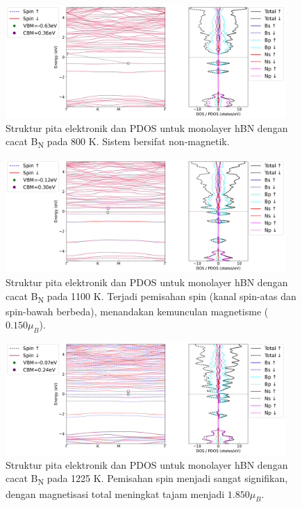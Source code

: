 \begin{figure}[htbp!] %
    \centering
    \includegraphics[width=0.95\textwidth]{gambar_hasil/simple_bands_pdos_BB_800K.png}
    \caption{Struktur pita elektronik dan PDOS untuk monolayer hBN dengan cacat B\textsubscript{N} pada 800 K. Sistem bersifat non-magnetik.}
    \label{fig:hbn_BB_800K}
\end{figure}
\begin{figure}[htbp!] %
    \centering
    \includegraphics[width=0.95\textwidth]{gambar_hasil/simple_bands_pdos_BB_1100K.png}
    \caption{Struktur pita elektronik dan PDOS untuk monolayer hBN dengan cacat B\textsubscript{N} pada 1100 K. Terjadi pemisahan spin (kanal spin-atas dan spin-bawah berbeda), menandakan kemunculan magnetisme ($0.150 \mu_B$).}
    \label{fig:hbn_BB_1100K}
\end{figure}
\begin{figure}[htbp!] %
    \centering
    \includegraphics[width=0.95\textwidth]{gambar_hasil/simple_bands_pdos_BB_1225K.png}
    \caption{Struktur pita elektronik dan PDOS untuk monolayer hBN dengan cacat B\textsubscript{N} pada 1225 K. Pemisahan spin menjadi sangat signifikan, dengan magnetisasi total meningkat tajam menjadi $1.850 \mu_B$.}
    \label{fig:hbn_BB_1225K}
\end{figure}

